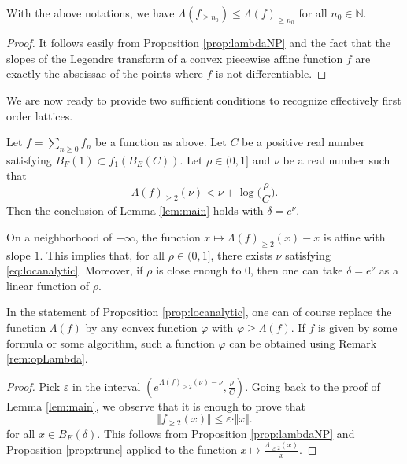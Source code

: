 \documentclass{lms}
\begin{document}
\begin{prop} \label{prop:trunc}
With the above notations, we have $\Lambda(f_{\geq n_0}) \leq
\Lambda(f)_{\geq n_0}$ for all $n_0 \in \mathbb N$.
\end{prop}

\begin{proof}
It follows easily from Proposition \ref{prop:lambdaNP} and the fact that 
the slopes of the Legendre transform of a convex piecewise affine 
function $f$ are exactly the abscissae of the points where $f$ is not 
differentiable.
\end{proof}

We are now ready to provide two sufficient conditions to recognize 
effectively first order lattices.

\begin{prop}
\label{prop:locanalytic}
Let $f = \sum_{n \geq 0} f_n$ be a function as above.
Let $C$ be a positive real number satisfying 
$B_F(1) \subset f_1(B_E(C))$.
Let $\rho \in (0, 1]$ and $\nu$ be a real number such that 
\begin{equation}
\label{eq:locanalytic}
\Lambda(f)_{\geq 2} (\nu) < \nu + \log \Big( \frac \rho C \Big).
\end{equation}
Then the conclusion of Lemma \ref{lem:main} holds with $\delta = e^\nu$.
\end{prop}

\begin{rem}
On a neighborhood of $-\infty$, the function $x \mapsto \Lambda(f)_{\geq 
2} (x) - x$ is affine with slope $1$. This implies that, for all $\rho 
\in (0,1]$, there exists $\nu$ satisfying \eqref{eq:locanalytic}. Moreover,
if $\rho$ is close enough to $0$, then one can take $\delta = e^\nu$ as a 
linear function of $\rho$.
\end{rem}

\begin{rem}
In the statement of Proposition \ref{prop:locanalytic}, one can of 
course replace the function $\Lambda(f)$ by any convex function 
$\varphi$ with $\varphi \geq \Lambda(f)$. If $f$ is given by some
formula or some algorithm, such a function $\varphi$ can be obtained
using Remark \ref{rem:opLambda}.
\end{rem}

\begin{proof}
Pick $\varepsilon$ in the interval $(e^{\Lambda(f)_{\geq 2} (\nu) - \nu}, 
\frac \rho C)$. Going back to the proof of Lemma \ref{lem:main}, we 
observe that it is enough to prove that
\begin{equation}
\label{eq:boundqueue} 
\Vert f_{\geq 2}(x) \Vert \leq \varepsilon \cdot \Vert x \Vert.
\end{equation}
for all $x \in B_E(\delta)$.
This follows from Proposition \ref{prop:lambdaNP} and Proposition
\ref{prop:trunc} applied to the function $x \mapsto \frac {\Lambda_{\geq 
2}(x)} x$.
\end{proof}
\end{document}
